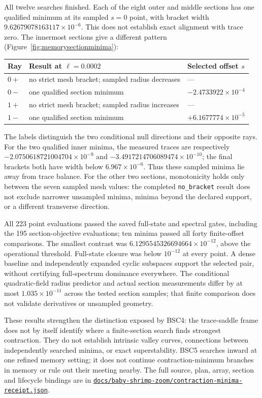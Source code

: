 \documentclass[11pt,letterpaper]{article}
\newcommand{\repourl}{https://github.com/tdj28/neural-shrimp}
\newcommand{\memoryminrepo}[1]{\href{\repourl/blob/f56b4d4b1c00450ae34bb2ee9f2f6ad6bb70f12b/#1}{\nolinkurl{#1}}}
\begin{document}
All twelve searches finished. Each of the eight outer and middle sections has one qualified minimum at its
sampled $s=0$ point, with bracket width $9.62679078163117\times10^{-6}$. This does not establish exact
alignment with trace zero. The innermost sections give a different pattern (Figure~\ref{fig:memorysectionminima}):
\begin{center}
\small
\begin{tabular}{lll}
\hline
Ray & Result at $\ell=0.0002$ & Selected offset $s$ \\
\hline
$0+$ & no strict mesh bracket; sampled radius decreases & --- \\
$0-$ & one qualified section minimum & $-2.4733922\times10^{-4}$ \\
$1+$ & no strict mesh bracket; sampled radius increases & --- \\
$1-$ & one qualified section minimum & $+6.1677774\times10^{-5}$ \\
\hline
\end{tabular}
\end{center}
The labels distinguish the two conditional null directions and their opposite rays.
For the two qualified inner minima, the measured traces are respectively
$-2.0750618721004704\times10^{-9}$ and $-3.4917214706089474\times10^{-10}$; the final brackets both
have width below $6.967\times10^{-6}$. Thus these sampled minima lie away from trace balance. For the
other two sections, monotonicity holds only between the seven sampled mesh values: the completed
\texttt{no\_bracket} result does not exclude narrower unsampled minima, minima beyond the declared support,
or a different transverse direction.

All 223 point evaluations passed the saved full-state and spectral gates, including the 195 section-objective
evaluations; ten minima passed all forty finite-offset comparisons. The smallest contrast was
$6.1295545326694664\times10^{-12}$, above the operational threshold. Full-state closure was below
$10^{-12}$ at every point. A dense baseline and independently expanded cyclic subspaces support the selected
pair, without certifying full-spectrum dominance everywhere. The conditional quadratic-field radius predictor
and actual section measurements differ by at most $1.035\times10^{-11}$ across the tested section samples;
that finite comparison does not validate derivatives or unsampled geometry.

These results strengthen the distinction exposed by BSC4: the trace-saddle frame does not by itself identify
where a finite-section search finds strongest contraction. They do not establish intrinsic valley curves,
connections between independently searched minima, or exact superstability. BSC5 searches inward at one
refined memory setting; it does not continue contraction-minimum branches in memory or rule out their meeting
nearby. The full source, plan, array, section and lifecycle bindings are in
\memoryminrepo{docs/baby-shrimp-zoom/contraction-minima-receipt.json}.
\end{document}
